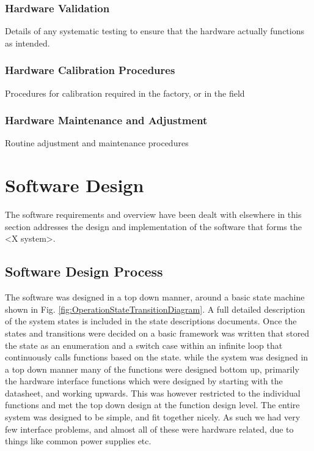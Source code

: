 \documentclass[]{report}
\begin{document}
\subsection{Hardware Validation}
Details of any systematic testing to ensure that the hardware actually functions as intended.

\subsection{Hardware Calibration Procedures}
Procedures for calibration required in the factory, or in the field

\subsection{Hardware Maintenance and Adjustment}
Routine adjustment and maintenance procedures

\chapter{Software Design}
The software requirements and overview have been dealt with elsewhere in this section addresses the design and implementation of the software that forms the <X system>.

\section{Software Design Process}
The software was designed in a top down manner, around a basic state machine shown in Fig. \ref{fig:OperationStateTransitionDiagram}. A full detailed description of the system states is included in the state descriptions documents. 
Once the states and transitions were decided on a basic framework was written that stored the state as an enumeration and a switch case within an infinite loop that continuously calls functions based on the state. \newline
while the system was designed in a top down manner many of the functions were designed bottom up, primarily the hardware interface functions which were designed by starting with the datasheet, and working upwards. This was however restricted to the individual functions and met the top down design at the function design level. \newline
The entire system was designed to be simple, and fit together nicely. As such we had very few interface problems, and almost all of these were hardware related, due to things like common power supplies etc.
\end{document}
